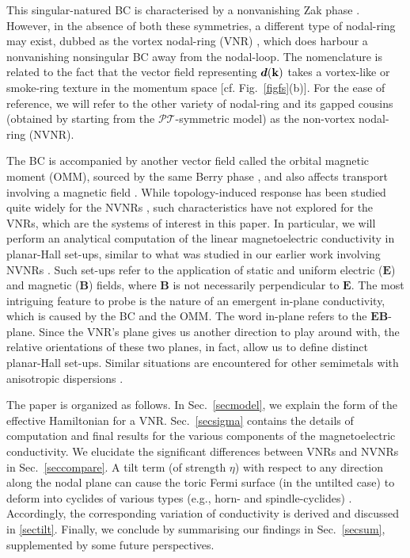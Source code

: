 \documentclass[aps,prb,onecolumn, footinbib, 10pt]{revtex4-2}
\newcommand{\bs}[1]{\boldsymbol{#1}}
\begin{document}
This singular-natured BC is characterised by a nonvanishing Zak phase \cite{schnyder_nodal, biao_nodal, zak_nodal, ips-nlsm-ph}. However, in the absence of both these symmetries, a different type of nodal-ring may exist, dubbed as the vortex nodal-ring (VNR) \cite{vortex-nrsm}, which does harbour a nonvanishing nonsingular BC away from the nodal-loop. The nomenclature is related to the fact that the vector field representing $\boldsymbol d (\bf k)$ takes a vortex-like or smoke-ring texture in the momentum space [cf. Fig.~\ref{figfs}(b)]. For the ease of reference, we will refer to the other variety of nodal-ring and its gapped cousins (obtained by starting from the $\mathcal P \mathcal T$-symmetric model) as the non-vortex nodal-ring (NVNR).


The BC is accompanied by another vector field called the orbital magnetic moment (OMM), sourced by the same Berry phase \cite{xiao_review,*sundaram99_wavepacket}, and also affects transport involving a magnetic field \cite{ips-ruiz, *ips-tilted, ips-rsw-ph, *ips-shreya, ips-spin1-ph, ips-exact-spin1, *ips-exact-kwn, * ips-exact-rsw, ips-nlsm-ph}. While topology-induced response has been studied quite widely for the NVNRs \cite{schnyder_nodal, yang1, yang_review_nlsm, chen_nlsm, ips-magnus, flores, phe_nlsm, claudia_nlsm, enke, ips-nlsm-ph}, such characteristics have not explored for the VNRs, which are the systems of interest in this paper. In particular, we will perform an analytical computation of the linear magnetoelectric conductivity in planar-Hall set-ups, similar to what was studied in our earlier work involving NVNRs \cite{ips-nlsm-ph}. Such set-ups refer to the application of static and uniform electric ($\bs E $) and magnetic ($\bs B$) fields, where $\bs B $ is not necessarily perpendicular to $\bs E $. The most intriguing feature to probe is the nature of an emergent in-plane conductivity, which is caused by the BC and the OMM. The word in-plane refers to the $\bs E \bs B$-plane. Since the VNR's plane gives us another direction to play around with, the relative orientations of these two planes, in fact, allow us to define distinct planar-Hall set-ups. Similar situations are encountered for other semimetals with anisotropic dispersions \cite{ips-tilted, rahul-jpcm}.

The paper is organized as follows. In Sec.~\ref{secmodel}, we explain the form of the effective Hamiltonian for a VNR. Sec.~\ref{secsigma} contains the details of computation and final results for the various components of the magnetoelectric conductivity. We elucidate the significant differences between VNRs and NVNRs in Sec.~\ref{seccompare}. A tilt term (of strength $\eta$) with respect to any direction along the nodal plane can cause the toric Fermi surface (in the untilted case) to deform into cyclides of various types (e.g., horn- and spindle-cyclides) \cite{ahn-tilted-nl}. Accordingly, the corresponding variation of conductivity is derived and discussed in \ref{sectilt}. Finally, we conclude by summarising our findings in Sec.~\ref{secsum}, supplemented by some future perspectives. 
\end{document}
